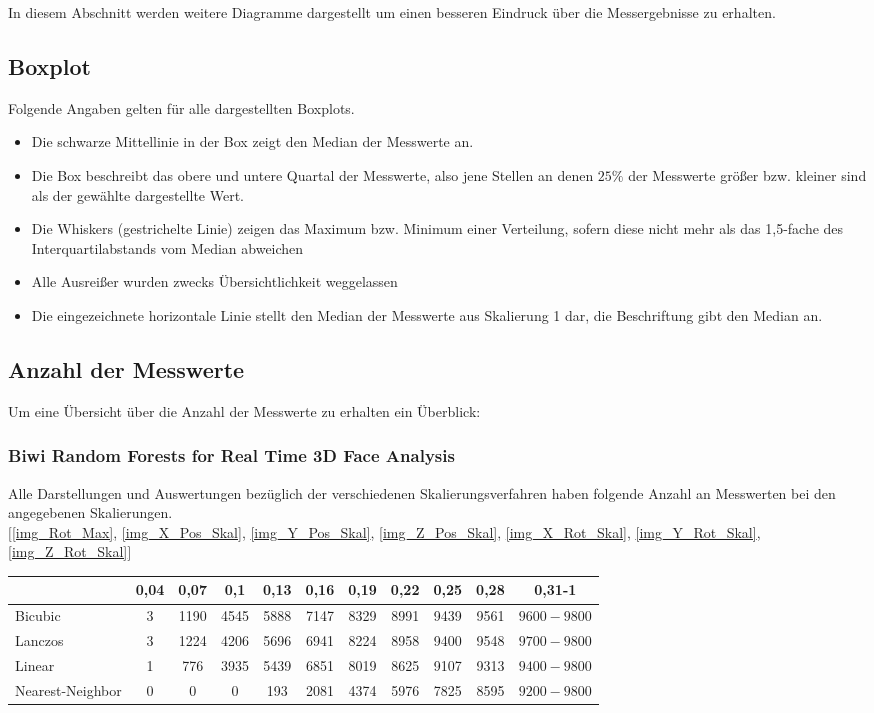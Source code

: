 \label{Abbildungen}
In diesem Abschnitt werden weitere Diagramme dargestellt um einen besseren Eindruck über die Messergebnisse zu erhalten.
\subsection*{Boxplot}
Folgende Angaben gelten für alle dargestellten Boxplots.
\begin{itemize}
	\item Die schwarze Mittellinie in der Box zeigt den Median der Messwerte an.
	\item Die Box beschreibt das obere und untere Quartal der Messwerte, also jene Stellen an denen $25\%$ der Messwerte größer bzw. kleiner sind als der gewählte dargestellte Wert.
	\item \glqq Die Whiskers (gestrichelte Linie) zeigen das Maximum bzw. Minimum einer Verteilung, sofern diese nicht mehr als das 1,5-fache des Interquartilabstands vom Median abweichen\grqq 
	\cite{wiki_Boxplot}
	\item Alle Ausreißer wurden zwecks Übersichtlichkeit weggelassen
	\item Die eingezeichnete horizontale Linie stellt den Median der Messwerte aus Skalierung 1 dar, die Beschriftung gibt den Median an.
\end{itemize}
\subsection*{Anzahl der Messwerte}
Um eine Übersicht über die Anzahl der Messwerte zu erhalten ein Überblick:
\subsubsection*{Biwi Random Forests for Real Time 3D Face Analysis \cite{database_Face_Ori}}
Alle Darstellungen und Auswertungen bezüglich der verschiedenen Skalierungsverfahren haben folgende Anzahl an Messwerten bei den angegebenen Skalierungen.\\
$[$\autoref{img_Rot_Max}, \autoref{img_X_Pos_Skal}, \autoref{img_Y_Pos_Skal}, \autoref{img_Z_Pos_Skal}, \autoref{img_X_Rot_Skal}, \autoref{img_Y_Rot_Skal}, \autoref{img_Z_Rot_Skal}$]$\\
\begin{tabular}{|l|c|c|c|c|c|c|c|c|c|c|}
	\hline 
	&0,04&0,07&0,1&0,13&0,16&0,19&0,22&0,25&0,28&0,31-1\\
	\hline 
	Bicubic&3&1190&4545&5888&7147&8329&8991&9439&9561&$9600-9800$\\
	\hline 
	Lanczos&3&1224&4206&5696&6941&8224&8958&9400&9548&$9700-9800$\\
	\hline 
	Linear&1&776&3935&5439&6851&8019&8625&9107&9313&$9400-9800$\\
	\hline 
	Nearest-Neighbor&0&0&0&193&2081&4374&5976&7825&8595&$9200-9800$\\ 
	\hline 
\end{tabular} 
